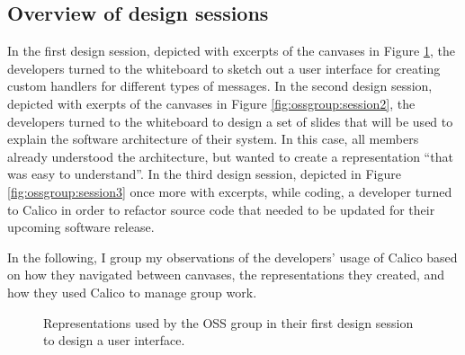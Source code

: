 \subsection{Overview of design sessions}

In the first design session, depicted with excerpts of the canvases in Figure \ref{fig:ossgroup:session1}, the developers turned to the whiteboard to sketch out a user interface for creating custom handlers for different types of messages. In the second design session, depicted with exerpts of the canvases in Figure \ref{fig:ossgroup:session2}, the developers turned to the whiteboard to design a set of slides that will be used to explain the software architecture of their system. In this case, all members already understood the architecture, but wanted to create a representation ``that was easy to understand''. In the third design session, depicted in Figure \ref{fig:ossgroup:session3} once more with excerpts, while coding, a developer turned to Calico in order to refactor source code that needed to be updated for their upcoming software release.

In the following, I group my observations of the developers' usage of Calico based on how they navigated between canvases, the representations they created, and how they used Calico to manage group work.

\begin{figure}%
  \centering
   \caption {Representations used by the OSS group in their first design session to design a user interface.}
   \label{fig:ossgroup:session1}
\end{figure}%

